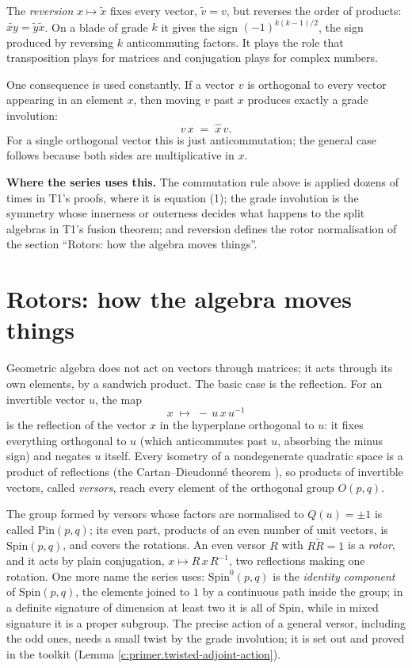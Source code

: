\documentclass[11pt]{article}
\theoremstyle{definition}
\theoremstyle{plain}
\providecommand{\Pin}{}\renewcommand{\Pin}{\mathrm{Pin}}
\providecommand{\Spin}{}\renewcommand{\Spin}{\mathrm{Spin}}
\begin{document}
The \emph{reversion} $x \mapsto \tilde{x}$ fixes every vector, $\tilde{v} = v$, but reverses the order of products: $\widetilde{xy} = \tilde{y}\tilde{x}$. On a blade of grade $k$ it gives the sign $(-1)^{k(k-1)/2}$, the sign produced by reversing $k$ anticommuting factors. It plays the role that transposition plays for matrices and conjugation plays for complex numbers.

One consequence is used constantly. If a vector $v$ is orthogonal to every vector appearing in an element $x$, then moving $v$ past $x$ produces exactly a grade involution:
\[
v\,x \;=\; \hat{x}\,v .
\]
For a single orthogonal vector this is just anticommutation; the general case follows because both sides are multiplicative in $x$.

\label{c:note.primer.setting-two-involutions-2}
\textbf{Where the series uses this.} The commutation rule above is applied dozens of times in T1's proofs, where it is equation (1); the grade involution is the symmetry whose innerness or outerness decides what happens to the split algebras in T1's fusion theorem; and reversion defines the rotor normalisation of the section ``Rotors: how the algebra moves things''.

\section{Rotors: how the algebra moves things}

\label{c:note.primer.setting-rotors-how-algebra-moves-things}
Geometric algebra does not act on vectors through matrices; it acts through its own elements, by a sandwich product. The basic case is the reflection. For an invertible vector $u$, the map
\[
x \;\longmapsto\; -\,u\,x\,u^{-1}
\]
is the reflection of the vector $x$ in the hyperplane orthogonal to $u$: it fixes everything orthogonal to $u$ (which anticommutes past $u$, absorbing the minus sign) and negates $u$ itself. Every isometry of a nondegenerate quadratic space is a product of reflections (the Cartan--Dieudonn\'e theorem \cite{Lam2005}), so products of invertible vectors, called \emph{versors}, reach every element of the orthogonal group $O(p,q)$.

The group formed by versors whose factors are normalised to $Q(u) = \pm 1$ is called $\Pin(p,q)$; its even part, products of an even number of unit vectors, is $\Spin(p,q)$, and covers the rotations. An even versor $R$ with $R\tilde{R} = 1$ is a \emph{rotor}, and it acts by plain conjugation, $x \mapsto R\,x\,R^{-1}$, two reflections making one rotation. One more name the series uses: $\Spin^0(p,q)$ is the \emph{identity component} of $\Spin(p,q)$, the elements joined to $1$ by a continuous path inside the group; in a definite signature of dimension at least two it is all of $\Spin$, while in mixed signature it is a proper subgroup. The precise action of a general versor, including the odd ones, needs a small twist by the grade involution; it is set out and proved in the toolkit (Lemma \ref{c:primer.twisted-adjoint-action}).
\end{document}
